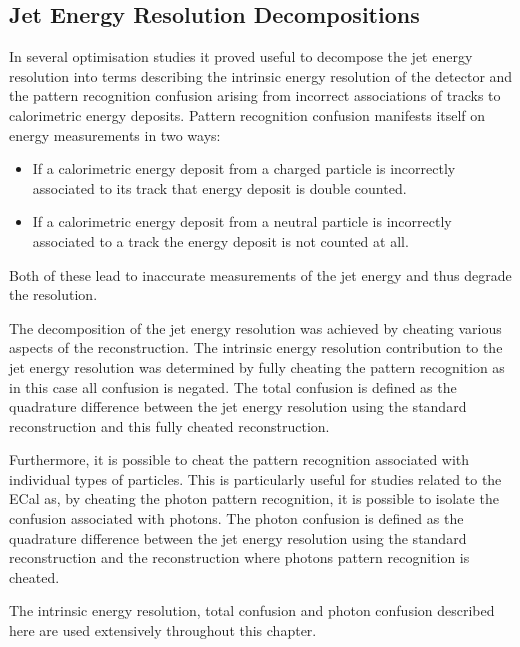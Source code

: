 
\subsection{Jet Energy Resolution Decompositions}
In several optimisation studies it proved useful to decompose the jet energy resolution into terms describing the intrinsic energy resolution of the detector and the pattern recognition confusion arising from incorrect associations of tracks to calorimetric energy deposits.  Pattern recognition confusion manifests itself on energy measurements in two ways:

\begin{itemize}
\item If a calorimetric energy deposit from a charged particle is incorrectly associated to its track that energy deposit is double counted.
\item If a calorimetric energy deposit from a neutral particle is incorrectly associated to a track the energy deposit is not counted at all.
\end{itemize}

Both of these lead to inaccurate measurements of the jet energy and thus degrade the resolution.   

The decomposition of the jet energy resolution was achieved by cheating various aspects of the reconstruction.  The intrinsic energy resolution contribution to the jet energy resolution was determined by fully cheating the pattern recognition as in this case all confusion is negated.  The total confusion is defined as the quadrature difference between the jet energy resolution using the standard reconstruction and this fully cheated reconstruction.  

Furthermore, it is possible to cheat the pattern recognition associated with individual types of particles.  This is particularly useful for studies related to the ECal as, by cheating the photon pattern recognition, it is possible to isolate the confusion associated with photons.  The photon confusion is defined as the quadrature difference between the jet energy resolution using the standard reconstruction and the reconstruction where photons pattern recognition is cheated.    

The intrinsic energy resolution, total confusion and photon confusion described here are used extensively throughout this chapter.


